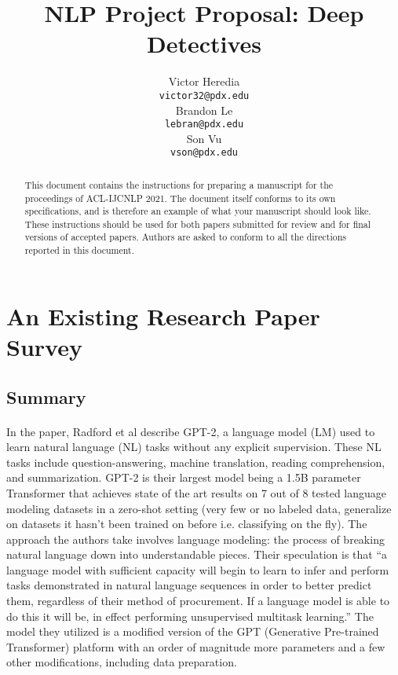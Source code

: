 \documentclass[11pt,a4paper]{article}
\title{NLP Project Proposal: Deep Detectives}
\author{Victor Heredia \\
  \texttt{victor32@pdx.edu} \\\And
  Brandon Le \\
  \texttt{lebran@pdx.edu} \\
  Son Vu \\
  \texttt{vson@pdx.edu} \\}
\date{}
\begin{document}
\maketitle
\begin{abstract}
This document contains the instructions for preparing a manuscript for the proceedings of ACL-IJCNLP 2021.
The document itself conforms to its own specifications, and is therefore an example of what your manuscript should look like.
These instructions should be used for both papers submitted for review and for final versions of accepted papers.
Authors are asked to conform to all the directions reported in this document.
\end{abstract}

\section{An Existing Research Paper Survey}

\subsection{Summary}

\paragraph{}
In the paper, Radford et al describe GPT-2, a language model (LM) used to learn natural language (NL) 
tasks without any explicit supervision. These NL tasks include question-answering, machine translation, 
reading comprehension, and summarization. GPT-2 is their largest model being a 1.5B parameter Transformer 
that achieves state of the art results on 7 out of 8 tested language modeling datasets in a zero-shot 
setting (very few or no labeled data, generalize on datasets it hasn’t been trained on before i.e. 
classifying on the fly). The approach the authors take involves language modeling: the process of breaking 
natural language down into understandable pieces. Their speculation is that “a language model with sufficient 
capacity will begin to learn to infer and perform tasks demonstrated in natural language sequences in 
order to better predict them, regardless of their method of procurement. If a language model is able to do 
this it will be, in effect performing unsupervised multitask learning.” The model they utilized is a modified 
version of the GPT (Generative Pre-trained Transformer) platform with an order of magnitude more parameters 
and a few other modifications, including data preparation.
\end{document}
